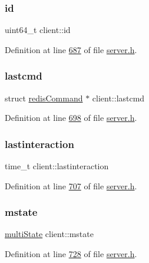 \subsubsection{\texorpdfstring{id}{id}}
{\footnotesize\ttfamily uint64\+\_\+t client\+::id}



Definition at line \hyperlink{server_8h_source_l00687}{687} of file \hyperlink{server_8h_source}{server.\+h}.

\mbox{\label{structclient_ac1c9b9f63c1b0ed7f48b6d50111000ae}} 
\subsubsection{\texorpdfstring{lastcmd}{lastcmd}}
{\footnotesize\ttfamily struct \hyperlink{structredisCommand}{redis\+Command} $\ast$ client\+::lastcmd}



Definition at line \hyperlink{server_8h_source_l00698}{698} of file \hyperlink{server_8h_source}{server.\+h}.

\mbox{\label{structclient_a5864006ae7f232001e8a8909327c4e86}} 
\subsubsection{\texorpdfstring{lastinteraction}{lastinteraction}}
{\footnotesize\ttfamily time\+\_\+t client\+::lastinteraction}



Definition at line \hyperlink{server_8h_source_l00707}{707} of file \hyperlink{server_8h_source}{server.\+h}.

\mbox{\label{structclient_a275cc795a09bb7b6f24a88f6c37a0f81}} 
\subsubsection{\texorpdfstring{mstate}{mstate}}
{\footnotesize\ttfamily \hyperlink{structmultiState}{multi\+State} client\+::mstate}



Definition at line \hyperlink{server_8h_source_l00728}{728} of file \hyperlink{server_8h_source}{server.\+h}.

